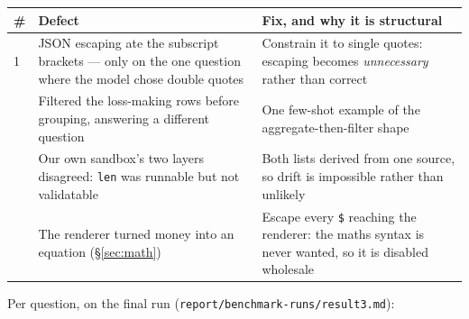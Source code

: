 \documentclass[11pt,a4paper]{article}
\begin{document}
\begin{center}
\begin{tabularx}{\textwidth}{@{}lXX@{}}
\toprule
\textbf{\#} & \textbf{Defect} & \textbf{Fix, and why it is structural} \\
\midrule
1 & JSON escaping ate the subscript brackets --- only on the one question where the model chose double quotes &
    Constrain it to single quotes: escaping becomes \emph{unnecessary} rather than correct \\
\addlinespace
2 & Filtered the loss-making rows before grouping, answering a different question &
    One few-shot example of the aggregate-then-filter shape \\
\addlinespace
3 & Our own sandbox's two layers disagreed: \texttt{len} was runnable but not validatable &
    Both lists derived from one source, so drift is impossible rather than unlikely \\
\addlinespace
4 & The renderer turned money into an equation (\S\ref{sec:math}) &
    Escape every \texttt{\$} reaching the renderer: the maths syntax is never wanted, so it is disabled wholesale \\
\bottomrule
\end{tabularx}
\end{center}

Per question, on the final run (\texttt{report/benchmark-runs/result3.md}):
\end{document}
